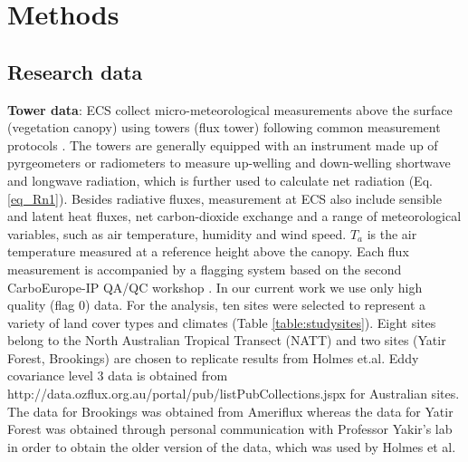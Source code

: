 \documentclass[fleqn,10pt]{wlscirep}
\begin{document}
{{ 


\section{Methods}  \label{sec:Methods}
\subsection{Research data}

\textbf{Tower data}:
ECS collect micro-meteorological measurements above the surface (vegetation canopy) using towers (flux tower) following common measurement protocols \cite{baldocchi2001fluxnet}. The towers are generally equipped with an instrument made up of pyrgeometers or radiometers to measure up-welling and down-welling shortwave and longwave radiation, which is further used to calculate net radiation (Eq. \ref{eq_Rn1}). Besides radiative fluxes, measurement at ECS also include sensible and latent heat fluxes, net carbon-dioxide exchange and a range of meteorological variables, such as air temperature, humidity and wind speed. $T_{a}$ is the air temperature measured at a reference height above the canopy. Each flux measurement is accompanied by a flagging system based on the second CarboEurope-IP QA/QC workshop \cite{gilberto2020fluxnet2015}. In our current work we use only high quality (flag 0) data. For the analysis, ten sites were selected to represent a variety of land cover types and climates (Table \ref{table:studysites}). Eight sites belong to the North Australian Tropical Transect (NATT) and two sites (Yatir Forest, Brookings) are chosen to replicate results from Holmes et.al\cite{holmes2009land}. Eddy covariance level 3 data is obtained from http://data.ozflux.org.au/portal/pub/listPubCollections.jspx for Australian sites. The data for Brookings was obtained from Ameriflux whereas the data for Yatir Forest was obtained through personal communication with Professor Yakir's lab in order to obtain the older version of the data, which was used by Holmes et al.\cite{holmes2009land}%

}}
\end{document}
